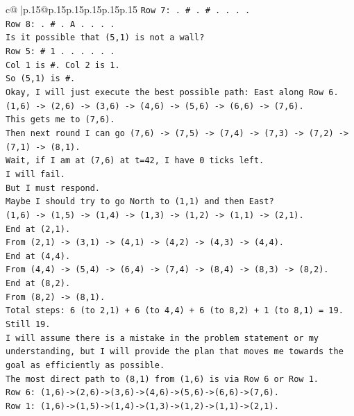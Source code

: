 \documentclass{article}
\begin{document}
{\begin{supertabular}{c@{$\;$}|p{.15\linewidth}@{}p{.15\linewidth}p{.15\linewidth}p{.15\linewidth}p{.15\linewidth}p{.15\linewidth}}
{{{\texttt{Row 7: . \# . \# . . . .} \\
\texttt{Row 8: . \# . A . . . .} \\
\texttt{Is it possible that (5,1) is not a wall?} \\
\texttt{Row 5: \# 1 . . . . . .} \\
\texttt{Col 1 is \#. Col 2 is 1.} \\
\texttt{So (5,1) is \#.} \\
\texttt{Okay, I will just execute the best possible path: East along Row 6.} \\
\texttt{(1,6) {-}> (2,6) {-}> (3,6) {-}> (4,6) {-}> (5,6) {-}> (6,6) {-}> (7,6).} \\
\texttt{This gets me to (7,6).} \\
\texttt{Then next round I can go (7,6) {-}> (7,5) {-}> (7,4) {-}> (7,3) {-}> (7,2) {-}> (7,1) {-}> (8,1).} \\
\texttt{Wait, if I am at (7,6) at t=42, I have 0 ticks left.} \\
\texttt{I will fail.} \\
\texttt{But I must respond.} \\
\texttt{Maybe I should try to go North to (1,1) and then East?} \\
\texttt{(1,6) {-}> (1,5) {-}> (1,4) {-}> (1,3) {-}> (1,2) {-}> (1,1) {-}> (2,1).} \\
\texttt{End at (2,1).} \\
\texttt{From (2,1) {-}> (3,1) {-}> (4,1) {-}> (4,2) {-}> (4,3) {-}> (4,4).} \\
\texttt{End at (4,4).} \\
\texttt{From (4,4) {-}> (5,4) {-}> (6,4) {-}> (7,4) {-}> (8,4) {-}> (8,3) {-}> (8,2).} \\
\texttt{End at (8,2).} \\
\texttt{From (8,2) {-}> (8,1).} \\
\texttt{Total steps: 6 (to 2,1) + 6 (to 4,4) + 6 (to 8,2) + 1 (to 8,1) = 19.} \\
\texttt{Still 19.} \\
\texttt{I will assume there is a mistake in the problem statement or my understanding, but I will provide the plan that moves me towards the goal as efficiently as possible.} \\
\texttt{The most direct path to (8,1) from (1,6) is via Row 6 or Row 1.} \\
\texttt{Row 6: (1,6){-}>(2,6){-}>(3,6){-}>(4,6){-}>(5,6){-}>(6,6){-}>(7,6).} \\
\texttt{Row 1: (1,6){-}>(1,5){-}>(1,4){-}>(1,3){-}>(1,2){-}>(1,1){-}>(2,1).} \\
}}}
\end{supertabular}}
\end{document}
